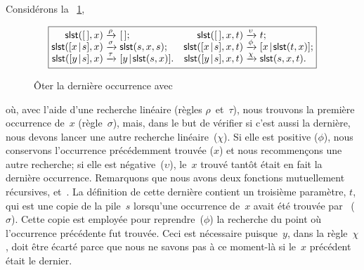 Considérons la \fig~\ref{fig:slst},
\begin{figure}
\begin{equation*}
\boxed{%
\begin{array}{@{}r@{\;}l@{\;}lr@{\;}l@{\;}l@{}}
  \fun{slst}(\el,x)           & \xrightarrow{\smash{\rho}} & \el;
& \fun{slst}(\el,x,t)         & \xrightarrow{\smash{\upsilon}} & t;\\
  \fun{slst}(\cons{x}{s},x)   & \xrightarrow{\smash{\sigma}} &
                                           \fun{slst}(s,x,s);
& \fun{slst}(\cons{x}{s},x,t) & \xrightarrow{\smash{\phi}} &
                                           \cons{x}{\fun{slst}(t,x)};\\
  \fun{slst}(\cons{y}{s},x)   & \xrightarrow{\smash{\tau}} &
                                           \cons{y}{\fun{slst}(s,x)}.
& \fun{slst}(\cons{y}{s},x,t) & \xrightarrow{\smash{\chi}} &
                                           \fun{slst}(s,x,t).
\end{array}}
\end{equation*}
\caption{Ôter la dernière occurrence avec }
\label{fig:slst}
\end{figure}
où, avec l'aide d'une recherche linéaire
(règles \(\rho\)~et~\(\tau\)), nous trouvons la première occurrence
de~\(x\) (règle~\(\sigma\)), mais, dans le but de vérifier si c'est
aussi la dernière, nous devons lancer une autre recherche
linéaire~(\(\chi\)). Si elle est positive (\(\phi\)), nous conservons
l'occurrence précédemment trouvée (\(x\)) et nous recommençons une
autre recherche; si elle est négative~(\(\upsilon\)), le~\(x\) trouvé
tantôt était en fait la dernière occurrence. Remarquons que nous avons
deux fonctions mutuellement récursives,
et~. La définition de cette
dernière contient un troisième paramètre, \(t\), qui est une copie de
la pile~\(s\) lorsqu'une occurrence de~\(x\) avait été trouvée
par~ (\(\sigma\)). Cette copie
est employée pour reprendre~(\(\phi\)) la recherche du point où
l'occurrence précédente fut trouvée. Ceci est nécessaire
puisque~\(y\), dans la règle~\(\chi\), doit être écarté parce que nous
ne savons pas à ce moment-là si le~\(x\) précédent était le dernier.

